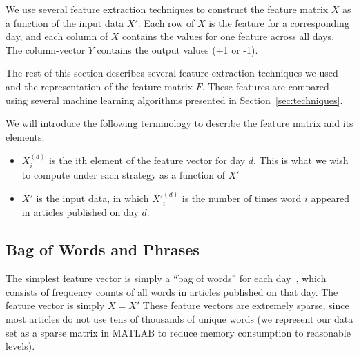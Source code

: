 \documentclass[10pt, twocolumn]{article}
\begin{document}
We use several feature extraction techniques to construct the feature matrix $X$ as a function of the input data $X'$. Each row of $X$ is the feature for a corresponding day, and each column of $X$
contains the values for one feature across all days. The column-vector $Y$ contains the output values (+1 or -1). 

The rest of this section describes several feature extraction techniques we used and the representation of the feature matrix $F$.  These features are compared using several machine learning algorithms presented in Section~\ref{sec:techniques}.

We will introduce the following terminology to describe the feature matrix and its elements:

\begin{itemize}


\item $X^{(d)}_{i}$ is the ith element of the feature vector for day $d$. This is what we wish to compute under each strategy as a function of $X'$

\item $X'$ is the input data, in which $X'^{(d)}_i$ is the number of times word $i$ appeared in articles published on day $d$.


\end{itemize}

\subsection{Bag of Words and Phrases}
\label{sec:bagsofwords}

The simplest feature vector is simply a ``bag of words'' for each day~\cite{featurehash}, which consists of frequency counts of all words in articles published on that day. The feature vector is simply $\displaystyle X = X'$ These feature vectors are extremely sparse, since most articles do not use tens of thousands of unique words (we represent our data set as a sparse matrix
in MATLAB to reduce memory consumption to reasonable levels).
\end{document}
